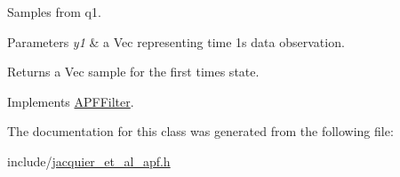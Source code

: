 Samples from q1. 


\begin{DoxyParams}{Parameters}
{\em y1} & a Vec representing time 1\textquotesingle{}s data observation. \\
\hline
\end{DoxyParams}
\begin{DoxyReturn}{Returns}
a Vec sample for the first time\textquotesingle{}s state. 
\end{DoxyReturn}


Implements \hyperlink{classAPFFilter_a017be49a493263156ae60ccc424f7daa}{A\+P\+F\+Filter}.



The documentation for this class was generated from the following file\+:\begin{DoxyCompactItemize}
\item 
include/\hyperlink{jacquier__et__al__apf_8h}{jacquier\+\_\+et\+\_\+al\+\_\+apf.\+h}\end{DoxyCompactItemize}
